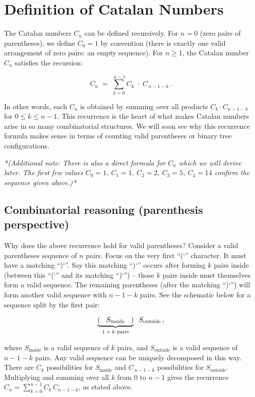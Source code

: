 \documentclass{article}
\begin{document}
\section{Definition of Catalan Numbers}

The Catalan numbers $C_n$ can be defined recursively. For $n=0$ (zero pairs of parentheses), we define $C_0 = 1$ by convention (there is exactly one valid arrangement of zero pairs: an empty sequence). For $n\ge 1$, the Catalan number $C_n$ satisfies the recursion:

\[
C_n \;=\; \sum_{k=0}^{\,n-1} C_k \;\cdot\; C_{\,n-1-k}\,.
\]

In other words, each $C_n$ is obtained by summing over all products $C_k \cdot C_{n-1-k}$ for $0 \le k \le n-1$. This recurrence is the heart of what makes Catalan numbers arise in so many combinatorial structures. We will soon see why this recurrence formula makes sense in terms of counting valid parentheses or binary tree configurations.

\textit{*(Additional note: There is also a direct formula for $C_n$ which we will derive later. The first few values $C_0=1$, $C_1=1$, $C_2=2$, $C_3=5$, $C_4=14$ confirm the sequence given above.)*}

\subsection*{Combinatorial reasoning (parenthesis perspective)}

Why does the above recurrence hold for valid parentheses? Consider a valid parentheses sequence of $n$ pairs. Focus on the very first “(`” character. It must have a matching “)`”. Say this matching “)`” occurs after forming $k$ pairs inside (between this “(`” and its matching “)`”) – those $k$ pairs inside must themselves form a valid sequence. The remaining parentheses (after the matching “)`”) will form another valid sequence with $n-1-k$ pairs. See the schematic below for a sequence split by the first pair:

\[
\underbrace{\vphantom{()}( \;\;\; S_{\text{inside}} \;\;\; )}_{\text{$1+k$ pairs}} \;\; S_{\text{outside}}\,,
\] 

where $S_{\text{inside}}$ is a valid sequence of $k$ pairs, and $S_{\text{outside}}$ is a valid sequence of $n-1-k$ pairs. Any valid sequence can be uniquely decomposed in this way. There are $C_k$ possibilities for $S_{\text{inside}}$ and $C_{\,n-1-k}$ possibilities for $S_{\text{outside}}$. Multiplying and summing over all $k$ from $0$ to $n-1$ gives the recurrence $C_n = \sum_{k=0}^{n-1} C_k\,C_{n-1-k}$, as stated above.
\end{document}

